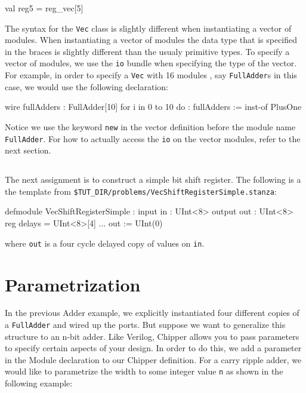 \begin{stanza}
val reg5 = reg_vec[5]
\end{stanza}

The syntax for the \verb+Vec+ class is slightly different when instantiating a vector of modules. When instantiating a vector of modules the data type that is specified in the {} braces is slightly different than the usualy primitive types. To specify a vector of modules, we use the \verb+io+ bundle when specifying the type of the vector. For example, in order to specify a \verb+Vec+ with 16 modules , say \verb+FullAdder+s in this case, we would use the following declaration:

\begin{stanza}
wire fullAdders : FullAdder[10]
for i in 0 to 10 do :
  fullAdders := inst-of PlusOne
\end{stanza}

Notice we use the keyword \verb+new+ in the vector definition before the module name \verb+FullAdder+. For how to actually access the \verb+io+ on the vector modules, refer to the next section.

\subsection{}

The next assignment is to construct a simple bit shift register.
The following is a the template from \verb+$TUT_DIR/problems/VecShiftRegisterSimple.stanza+:

\begin{stanza}
defmodule VecShiftRegisterSimple :
  input in   : UInt<8>
  output out : UInt<8>
  reg delays = UInt<8>[4]
  ...
  out := UInt(0)
\end{stanza}

\noindent
where \verb+out+ is a four cycle delayed copy of values on \verb+in+.

\section{Parametrization}

In the previous Adder example, we explicitly instantiated four different copies of a \verb+FullAdder+ and wired up the ports. But suppose we want to generalize this structure to an n-bit adder. Like Verilog, Chipper allows you to pass parameters to specify certain aspects of your design. In order to do this, we add a parameter in the Module declaration to our Chipper definition.
For a carry ripple adder, we would like to parametrize the width to some integer value \verb+n+ as shown in the following example:

